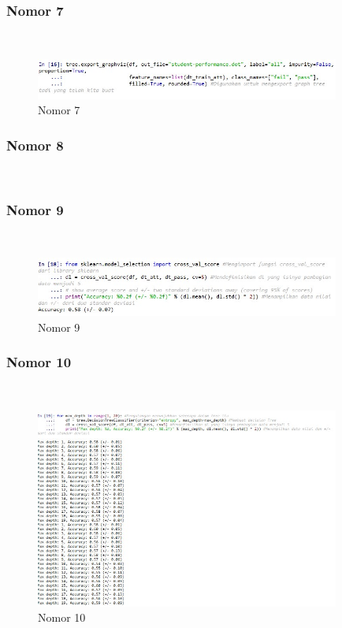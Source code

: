\subsubsection{Nomor 7}
\hfill\\

\begin{figure}[H]
\centerline{\includegraphics[width=10cm]{figures/1174057/chapter2/17.jpg}}
\caption{Nomor 7}
\label{labelgambar}
\end{figure}

\subsubsection{Nomor 8}
\hfill\\


\subsubsection{Nomor 9}
\hfill\\

\begin{figure}[H]
\centerline{\includegraphics[width=10cm]{figures/1174057/chapter2/19.jpg}}
\caption{Nomor 9}
\label{labelgambar}
\end{figure}

\subsubsection{Nomor 10}
\hfill\\

\begin{figure}[H]
\centerline{\includegraphics[width=10cm]{figures/1174057/chapter2/20.jpg}}
\caption{Nomor 10}
\label{labelgambar}
\end{figure}

